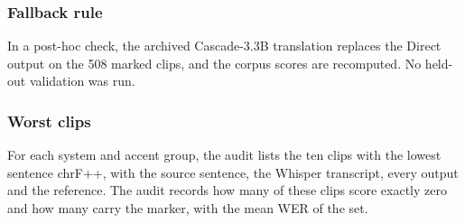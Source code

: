 \subsubsection{Fallback rule}
In a post-hoc check, the archived Cascade-3.3B translation replaces the Direct output on the 508 marked clips, and the corpus scores are recomputed. No held-out validation was run.

\subsubsection{Worst clips}
For each system and accent group, the audit lists the ten clips with the lowest sentence chrF++, with the source sentence, the Whisper transcript, every output and the reference. The audit records how many of these clips score exactly zero and how many carry the marker, with the mean WER of the set.
